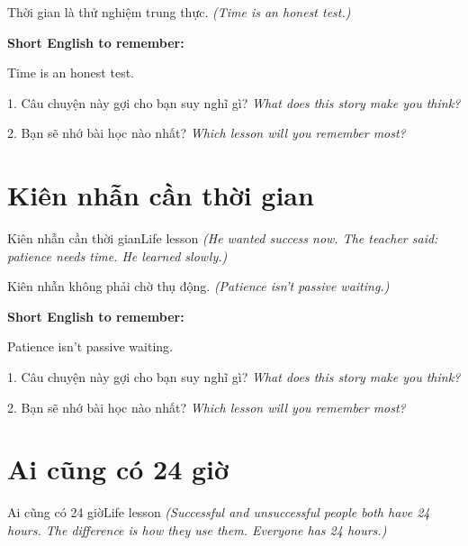 \begin{baihoc}
Thời gian là thử nghiệm trung thực.
\textit{(Time is an honest test.)}
\end{baihoc}

\begin{ghinhoanh}
\textbf{Short English to remember:}

Time is an honest test.

\end{ghinhoanh}

\begin{tuhocnhanh}
1. Câu chuyện này gợi cho bạn suy nghĩ gì? \textit{What does this story make you think?}

2. Bạn sẽ nhớ bài học nào nhất? \textit{Which lesson will you remember most?}
\end{tuhocnhanh}
\ngancach


\section{Kiên nhẫn cần thời gian}
\begin{truyen}{Kiên nhẫn cần thời gian}{Life lesson}
\textit{(He wanted success now. The teacher said: patience needs time. He learned slowly.)}
\end{truyen}

\begin{baihoc}
Kiên nhẫn không phải chờ thụ động.
\textit{(Patience isn't passive waiting.)}
\end{baihoc}

\begin{ghinhoanh}
\textbf{Short English to remember:}

Patience isn't passive waiting.

\end{ghinhoanh}

\begin{tuhocnhanh}
1. Câu chuyện này gợi cho bạn suy nghĩ gì? \textit{What does this story make you think?}

2. Bạn sẽ nhớ bài học nào nhất? \textit{Which lesson will you remember most?}
\end{tuhocnhanh}
\ngancach


\section{Ai cũng có 24 giờ}
\begin{truyen}{Ai cũng có 24 giờ}{Life lesson}
\textit{(Successful and unsuccessful people both have 24 hours. The difference is how they use them. Everyone has 24 hours.)}
\end{truyen}


